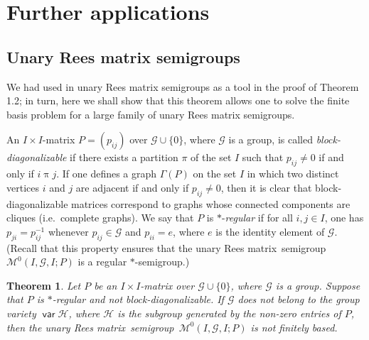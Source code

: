 \documentclass[11pt,reqno]{amsart}
\DeclareMathOperator{\var}{\mathsf{var}}
\numberwithin{equation}{section}
\newtheorem{Thm}{Theorem}[section]
\theoremstyle{remark}
\def\cal{\mathcal}
\def\Mc{{\cal M}}
\def\m{\mathrel}
\def\Rm{Rees matrix}
\def\sm{semi\-group}
\begin{document}
\section{Further applications}
\subsection{Unary Rees matrix semigroups}
We had used in \cite{adv} unary Rees matrix semigroups as a tool in the proof of
Theorem 1.2; in turn, here we shall show
that this theorem allows one to solve the finite
basis problem for a large family of unary Rees matrix semigroups.

An $I\times I$-matrix $P=(p_{ij})$ over $\mathcal{G}\cup\{0\}$,
where $\mathcal{G}$ is a group, is called
\emph{block-diagonalizable} if there exists a partition $\pi$ of
the set $I$ such that $p_{ij}\ne 0$ if and only if $i\m{\pi}j$. If
one defines a graph $\Gamma(P)$ on the set $I$ in which two
distinct vertices $i$ and $j$ are adjacent if and only if
$p_{ij}\ne0$, then it is clear that block-diagonalizable matrices
correspond to graphs whose connected components are cliques (i.e.\
complete graphs). We say that $P$ is $*$-\emph{regular} if for all
$i,j\in I$, one has $p_{ji}=p_{ij}^{-1}$ whenever $p_{ij}\in
\mathcal{G}$ and $p_{ii}=e$, where $e$ is the identity element of
$\mathcal{G}$. (Recall that this property ensures that the unary
\Rm\ \sm\ $\Mc^0(I,\mathcal{G},I;P)$ is a regular $*$-semigroup.)

\begin{Thm}
\label{Rees matrix} Let $P$ be an $I\times I$-matrix over
$\mathcal{G}\cup\{0\}$, where $\mathcal{G}$ is a group. Suppose
that $P$ is $*$-regular and not block-diagonalizable. If
$\mathcal{G}$ does not belong to the group variety
$\var\mathcal{H}$, where $\mathcal{H}$ is the subgroup generated
by the non-zero entries of $P$, then the unary \Rm\ \sm\
$\Mc^0(I,\mathcal{G},I;P)$ is not finitely based.
\end{Thm}
\end{document}
